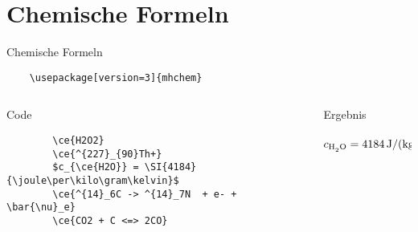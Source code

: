 \section{Chemische Formeln}
\begin{frame}[fragile]{Chemische Formeln}
  \begin{Packages}
    \begin{lstlisting}
    \usepackage[version=3]{mhchem}
    \end{lstlisting}
  \end{Packages}
  \begin{columns}[onlytextwidth, t]
    \begin{column}{0.51\textwidth}
      \begin{block}{Code}
        \begin{lstlisting}
        \ce{H2O2}
        \ce{^{227}_{90}Th+}
        $c_{\ce{H2O}} = \SI{4184}{\joule\per\kilo\gram\kelvin}$
        \ce{^{14}_6C -> ^{14}_7N  + e- + \bar{\nu}_e}
        \ce{CO2 + C <=> 2CO}
        \end{lstlisting}
      \end{block}
    \end{column}
    \begin{column}{0.45\textwidth}
      \linespread{1.3}
      \begin{block}{Ergebnis}
         \\
         \\
        $c_{\ce{H2O}} = \SI{4184}{\joule\per\kilo\gram\per\kelvin}$ \\[0.3\baselineskip]
         \\[0.3\baselineskip]
      \end{block}
    \end{column}
  \end{columns}
\end{frame}
